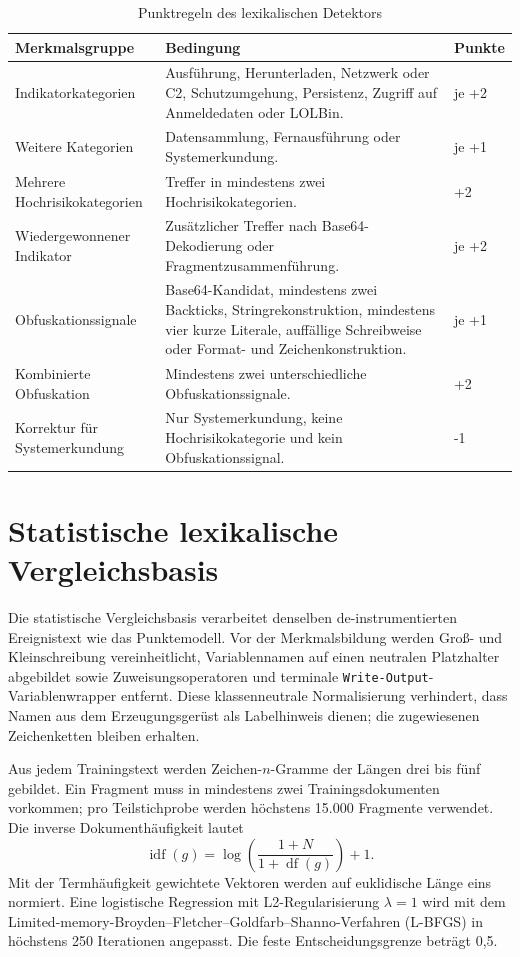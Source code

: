 \documentclass[12pt,a4paper,oneside,parskip=half]{scrreprt}
\begin{document}
\begin{table}[H]
\centering
\caption[Punktregeln des lexikalischen Detektors]{Punktregeln des lexikalischen Detektors}
\label{tab:score-model}
\small
\begin{tabularx}{\textwidth}{|L{4.1cm}|Y|C{1.5cm}|}
\hline
\textbf{Merkmalsgruppe} & \textbf{Bedingung} & \textbf{Punkte}\\
\hline
Indikatorkategorien & Ausführung, Herunterladen, Netzwerk oder C2, Schutzumgehung, Persistenz, Zugriff auf Anmeldedaten oder LOLBin. & je +2\\
\hline
Weitere Kategorien & Datensammlung, Fernausführung oder Systemerkundung. & je +1\\
\hline
Mehrere Hochrisikokategorien & Treffer in mindestens zwei Hochrisikokategorien. & +2\\
\hline
Wiedergewonnener Indikator & Zusätzlicher Treffer nach Base64-Dekodierung oder Fragmentzusammenführung. & je +2\\
\hline
Obfuskationssignale & Base64-Kandidat, mindestens zwei Backticks, Stringrekonstruktion, mindestens vier kurze Literale, auffällige Schreibweise oder Format- und Zeichenkonstruktion. & je +1\\
\hline
Kombinierte Obfuskation & Mindestens zwei unterschiedliche Obfuskationssignale. & +2\\
\hline
Korrektur für Systemerkundung & Nur Systemerkundung, keine Hochrisikokategorie und kein Obfuskationssignal. & -1\\
\hline
\end{tabularx}
\end{table}
\section{Statistische lexikalische Vergleichsbasis}
Die statistische Vergleichsbasis verarbeitet denselben de-instrumentierten Ereignistext wie das Punktemodell. Vor der Merkmalsbildung werden Groß- und Kleinschreibung vereinheitlicht, Variablennamen auf einen neutralen Platzhalter abgebildet sowie Zuweisungsoperatoren und terminale \texttt{Write-Output}-Variablenwrapper entfernt. Diese klassenneutrale Normalisierung verhindert, dass Namen aus dem Erzeugungsgerüst als Labelhinweis dienen; die zugewiesenen Zeichenketten bleiben erhalten.

Aus jedem Trainingstext werden Zeichen-\(n\)-Gramme der Längen drei bis fünf gebildet. Ein Fragment muss in mindestens zwei Trainingsdokumenten vorkommen; pro Teilstichprobe werden höchstens 15.000 Fragmente verwendet. Die inverse Dokumenthäufigkeit lautet
\[
\operatorname{idf}(g)=\log\left(\frac{1+N}{1+\operatorname{df}(g)}\right)+1.
\]
Mit der Termhäufigkeit gewichtete Vektoren werden auf euklidische Länge eins normiert. Eine logistische Regression mit L2-Regularisierung \(\lambda=1\) wird mit dem Limited-memory-Broyden--Fletcher--Goldfarb--Shanno-Verfahren (L-BFGS) in höchstens 250 Iterationen angepasst. Die feste Entscheidungsgrenze beträgt 0{,}5.
\end{document}
